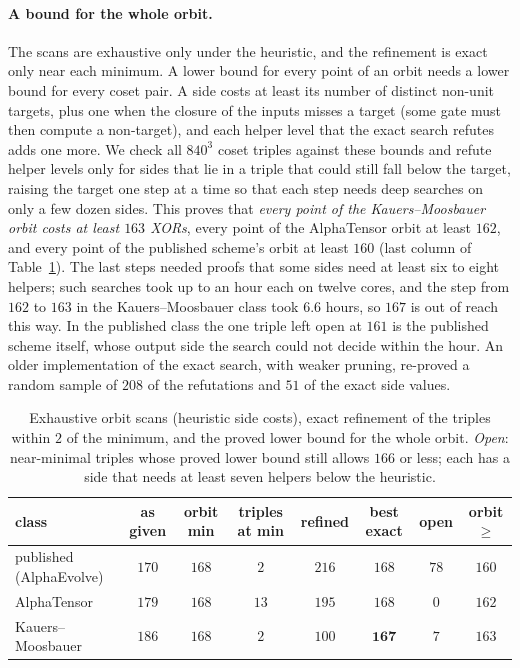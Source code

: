 \documentclass[11pt]{article}
\theoremstyle{remark}
\begin{document}
\paragraph{A bound for the whole orbit.}  The scans are exhaustive only
under the heuristic, and the refinement is exact only near each
minimum.  A lower bound for every point of an orbit needs a lower bound
for every coset pair.  A side costs at least its number of distinct
non-unit targets, plus one when the closure of the inputs misses a
target (some gate must then compute a non-target), and each helper
level that the exact search refutes adds one more.  We check all $840^3$
coset triples against these bounds and refute helper levels only for
sides that lie in a triple that could still fall below the target,
raising the target one step at a time so that each step needs deep
searches on only a few dozen sides.  This proves that \emph{every point
of the Kauers--Moosbauer orbit costs at least $163$ XORs}, every point
of the AlphaTensor orbit at least $162$, and every point of the
published scheme's orbit at least $160$ (last column of
Table~\ref{tab:classes}).  The last steps needed proofs that some sides
need at least six to eight helpers; such searches took up to an hour
each on twelve cores, and the step from $162$ to $163$ in the
Kauers--Moosbauer class took $6.6$ hours, so $167$ is out of reach this
way.  In the published class the one triple left open at $161$ is the
published scheme itself, whose output side the search could not decide
within the hour.  An older implementation of
the exact search, with weaker pruning, re-proved a random sample of
$208$ of the refutations and $51$ of the exact side values.

\begin{table}[ht]
\centering
\caption{Exhaustive orbit scans (heuristic side costs), exact
refinement of the triples within $2$ of the minimum, and the proved
lower bound for the whole orbit.  \emph{Open}: near-minimal triples
whose proved lower bound still allows $166$ or less; each has a side
that needs at least seven helpers below the heuristic.}\label{tab:classes}
\small
\setlength{\tabcolsep}{4pt}
\begin{tabular}{lccccccc}
\toprule
class & as given & orbit min & triples at min & refined & best exact & open & orbit $\ge$ \\
\midrule
published~\cite{PLinOpt} (AlphaEvolve) & $170$ & $168$ & $2$ & $216$ & $168$ & $78$ & $160$ \\
AlphaTensor~\cite{Fawzi22} & $179$ & $168$ & $13$ & $195$ & $168$ & $0$ & $162$ \\
Kauers--Moosbauer~\cite{KM23} & $186$ & $168$ & $2$ & $100$ & $\mathbf{167}$ & $7$ & $163$ \\
\bottomrule
\end{tabular}
\end{table}
\end{document}
